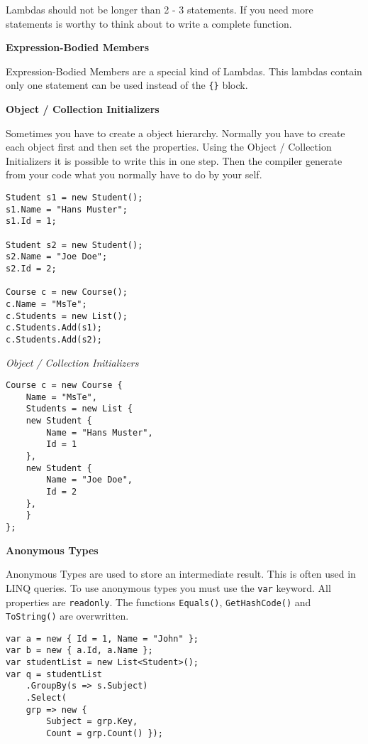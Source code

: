 \documentclass[11pt,twoside,landscape]{article}
\begin{document}
\begin{multicols}{3}
Lambdas should not be longer than 2 - 3 statements.
If you need more statements is worthy to think about to write a complete function.

\textbf{Expression-Bodied Members}

Expression-Bodied Members are a special kind of Lambdas.
This lambdas contain only one statement can be used instead of the \texttt{\{\}} block.

\textbf{Object / Collection Initializers}

Sometimes you have to create a object hierarchy.
Normally you have to create each object first and then set the properties.
Using the Object / Collection Initializers it is possible to write this in one step.
Then the compiler generate from your code what you normally have to do by your self.

\lstset{language=csharp,label= ,caption= ,captionpos=b,numbers=none}
\begin{lstlisting}
Student s1 = new Student();
s1.Name = "Hans Muster";
s1.Id = 1;

Student s2 = new Student();
s2.Name = "Joe Doe";
s2.Id = 2;

Course c = new Course();
c.Name = "MsTe";
c.Students = new List();
c.Students.Add(s1);
c.Students.Add(s2);
\end{lstlisting}

\emph{Object / Collection Initializers}
\lstset{language=csharp,label= ,caption= ,captionpos=b,numbers=none}
\begin{lstlisting}
Course c = new Course {
    Name = "MsTe",
    Students = new List {
	new Student {
	    Name = "Hans Muster",
	    Id = 1
	},
	new Student {
	    Name = "Joe Doe",
	    Id = 2
	},
    }
};
\end{lstlisting}

\textbf{Anonymous Types}

Anonymous Types are used to store an intermediate result.
This is often used in LINQ queries.
To use anonymous types you must use the \texttt{var} keyword.
All properties are \texttt{readonly}.
The functions \texttt{Equals()}, \texttt{GetHashCode()} and \texttt{ToString()} are overwritten.

\lstset{language=csharp,label= ,caption= ,captionpos=b,numbers=none}
\begin{lstlisting}
var a = new { Id = 1, Name = "John" };
var b = new { a.Id, a.Name };
var studentList = new List<Student>();
var q = studentList
    .GroupBy(s => s.Subject)
    .Select(
	grp => new {
	    Subject = grp.Key,
	    Count = grp.Count() });
\end{lstlisting}


\end{multicols}
\end{document}
